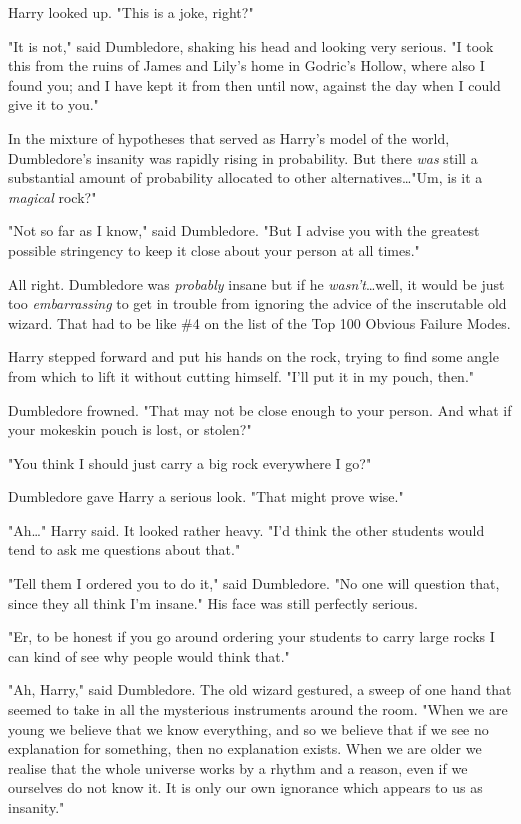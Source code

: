 Harry looked up. "This is a joke, right?"

"It is not," said Dumbledore, shaking his head and looking very serious. "I
took this from the ruins of James and Lily’s home in Godric’s Hollow, where
also I found you; and I have kept it from then until now, against the day when
I could give it to you."

In the mixture of hypotheses that served as Harry’s model of the world,
Dumbledore’s insanity was rapidly rising in probability. But there \emph{was}
still a substantial amount of probability allocated to other
alternatives…"Um, is it a \emph{magical} rock?"

"Not so far as I know," said Dumbledore. "But I advise you with the greatest
possible stringency to keep it close about your person at all times."

All right. Dumbledore was \emph{probably} insane but if he
\emph{wasn’t}…well, it would be just too \emph{embarrassing} to get in
trouble from ignoring the advice of the inscrutable old wizard. That had to be
like \#4 on the list of the Top 100 Obvious Failure Modes.

Harry stepped forward and put his hands on the rock, trying to find some angle
from which to lift it without cutting himself. "I’ll put it in my pouch, then."

Dumbledore frowned. "That may not be close enough to your person. And what if
your mokeskin pouch is lost, or stolen?"

"You think I should just carry a big rock everywhere I go?"

Dumbledore gave Harry a serious look. "That might prove wise."

"Ah…" Harry said. It looked rather heavy. "I’d think the other students
would tend to ask me questions about that."

"Tell them I ordered you to do it," said Dumbledore. "No one will question
that, since they all think I’m insane." His face was still perfectly serious.

"Er, to be honest if you go around ordering your students to carry large rocks
I can kind of see why people would think that."

"Ah, Harry," said Dumbledore. The old wizard gestured, a sweep of one hand that
seemed to take in all the mysterious instruments around the room. "When we are
young we believe that we know everything, and so we believe that if we see no
explanation for something, then no explanation exists. When we are older we
realise that the whole universe works by a rhythm and a reason, even if we
ourselves do not know it. It is only our own ignorance which appears to us as
insanity."

